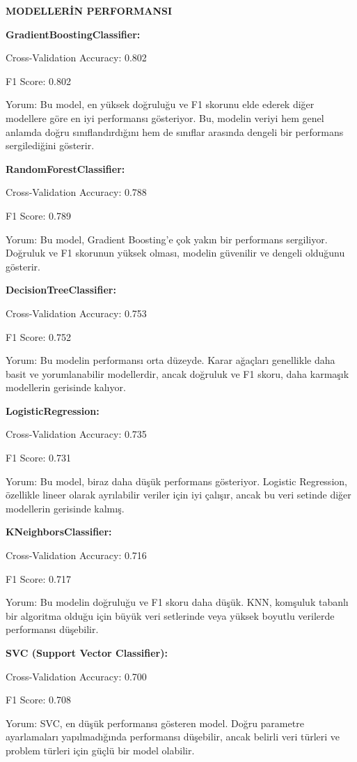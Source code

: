 \documentclass[twocolumn]{article}
\begin{document}
	\begin{flushleft}
		\textbf{MODELLERİN PERFORMANSI}
		
		\textbf{GradientBoostingClassifier:}
		\item Cross-Validation Accuracy: 0.802
		\item F1 Score: 0.802
		\item Yorum: Bu model, en yüksek doğruluğu ve F1 skorunu elde ederek diğer modellere göre en iyi performansı gösteriyor. Bu, modelin veriyi hem genel anlamda doğru sınıflandırdığını hem de sınıflar arasında dengeli bir performans sergilediğini gösterir.
		
		\textbf{RandomForestClassifier:}
		\item Cross-Validation Accuracy: 0.788
		\item F1 Score: 0.789
		\item Yorum: Bu model, Gradient Boosting'e çok yakın bir performans sergiliyor. Doğruluk ve F1 skorunun yüksek olması, modelin güvenilir ve dengeli olduğunu gösterir.
		
		\textbf{DecisionTreeClassifier:}
		\item Cross-Validation Accuracy: 0.753
		\item F1 Score: 0.752
		\item Yorum: Bu modelin performansı orta düzeyde. Karar ağaçları genellikle daha basit ve yorumlanabilir modellerdir, ancak doğruluk ve F1 skoru, daha karmaşık modellerin gerisinde kalıyor.
		
		\textbf{LogisticRegression:}
		\item Cross-Validation Accuracy: 0.735
		\item F1 Score: 0.731
		\item Yorum: Bu model, biraz daha düşük performans gösteriyor. Logistic Regression, özellikle lineer olarak ayrılabilir veriler için iyi çalışır, ancak bu veri setinde diğer modellerin gerisinde kalmış.
		
		\textbf{KNeighborsClassifier:}
		\item Cross-Validation Accuracy: 0.716
		\item F1 Score: 0.717
		\item Yorum: Bu modelin doğruluğu ve F1 skoru daha düşük. KNN, komşuluk tabanlı bir algoritma olduğu için büyük veri setlerinde veya yüksek boyutlu verilerde performansı düşebilir.
		
		\textbf{SVC (Support Vector Classifier):}
		\item Cross-Validation Accuracy: 0.700
		\item F1 Score: 0.708
		\item Yorum: SVC, en düşük performansı gösteren model. Doğru parametre ayarlamaları yapılmadığında performansı düşebilir, ancak belirli veri türleri ve problem türleri için güçlü bir model olabilir.
		

\end{flushleft}
\end{document}
